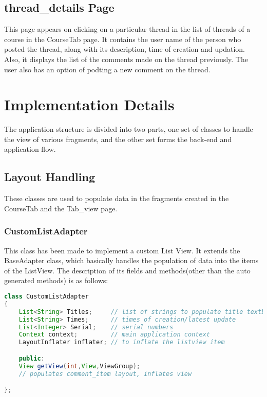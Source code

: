 \documentclass{article}
\begin{document}
\subsection{thread\_details Page}
\par\noindent This page appears on clicking on a particular thread in the list of threads of a course in the CourseTab page. It contains the user name of the person who posted the thread, along with its description, time of creation and updation. Also, it displays the list of the comments made on the thread previously. The user also has an option of podting a new comment on the thread.




\section{Implementation Details}
\par\noindent The application structure is divided into two parts, one set of classes to handle the view of various fragments, and the other set forms the back-end and application flow.
\subsection{Layout Handling}
\par\noindent These classes are used to populate data in the fragments created in the CourseTab and the Tab\_view page.

\subsubsection{CustomListAdapter}
\par\noindent This class has been made to implement a custom List View. It extends the BaseAdapter class, which basically handles the population of data into the items of the ListView. The description of its fields and methods(other than the auto generated methods) is as follows:

\begin{lstlisting}[language=Java, caption={Fields \& Methods of CustomListAdapter}]
class CustomListAdapter
{
	List<String> Titles;     // list of strings to populate title textbox
	List<String> Times;	     // times of creation/latest update
	List<Integer> Serial;    // serial numbers
	Context context;	     // main application context
	LayoutInflater inflater; // to inflate the listview item

	public:
	View getView(int,View,ViewGroup);
	// populates comment_item layout, inflates view

};
\end{lstlisting}
\end{document}
